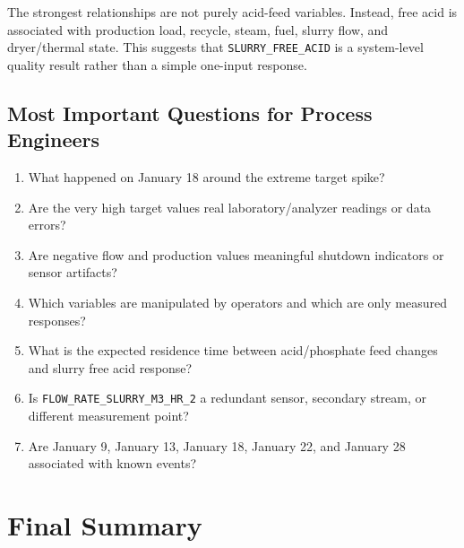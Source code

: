 \documentclass[11pt,a4paper]{article}
\begin{document}
The strongest relationships are not purely acid-feed variables. Instead, free acid is associated with production load, recycle, steam, fuel, slurry flow, and dryer/thermal state. This suggests that \texttt{SLURRY\_FREE\_ACID} is a system-level quality result rather than a simple one-input response.

\subsection{Most Important Questions for Process Engineers}

\begin{enumerate}
    \item What happened on January 18 around the extreme target spike?
    \item Are the very high target values real laboratory/analyzer readings or data errors?
    \item Are negative flow and production values meaningful shutdown indicators or sensor artifacts?
    \item Which variables are manipulated by operators and which are only measured responses?
    \item What is the expected residence time between acid/phosphate feed changes and slurry free acid response?
    \item Is \texttt{FLOW\_RATE\_SLURRY\_M3\_HR\_2} a redundant sensor, secondary stream, or different measurement point?
    \item Are January 9, January 13, January 18, January 22, and January 28 associated with known events?
\end{enumerate}

\section{Final Summary}
\end{document}
